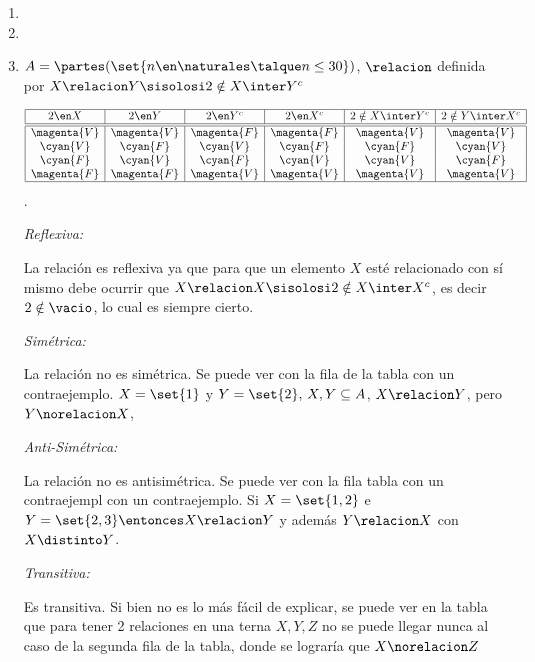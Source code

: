 \begin{enumerate}[label=\roman*)]
  \item \hacer
  \item \hacer
  \item $
          A =
          \partes(\set{n \en \naturales \talque n \leq 30})$, $\relacion$ definida por $X \relacion Y \sisolosi 2 \notin X \inter Y^c
        $\par
        $$
          \begin{array}{|c|c|c|c|c|c|}
            \hline
            2 \en X     & 2 \en Y     & 2 \en Y^c   & 2 \en X^c   & 2 \notin X \inter Y^c & 2 \notin Y \inter X^c \\ \hline  \hline
            \magenta{V} & \magenta{V} & \magenta{F} & \magenta{F} & \magenta{V}           & \magenta{V}           \\
            \cyan{V}    & \cyan{F}    & \cyan{V}    & \cyan{F}    & \cyan{F}              & \cyan{V}              \\
            \cyan{F}    & \cyan{V}    & \cyan{F}    & \cyan{V}    & \cyan{V}              & \cyan{F}              \\
            \magenta{F} & \magenta{F} & \magenta{V} & \magenta{V} & \magenta{V}           & \magenta{V}           \\ \hline
          \end{array}$$.

        \textit{Reflexiva:}\par
        La relación es reflexiva ya que para que un elemento $X$ esté relacionado con sí mismo debe ocurrir
        que $X \relacion X \sisolosi 2 \notin X \inter X^c$, es decir $2 \notin \vacio$, lo cual es siempre cierto.

        \textit{Simétrica:}\par
        La relación no es simétrica. Se puede ver con la  fila de la tabla con un contraejemplo.
        $X = \set{1}$ y $Y = \set{2},\, X,Y \subseteq A$, $X \relacion Y$, pero $Y \norelacion X$,

        \textit{Anti-Simétrica:}\par
        La relación no es antisimétrica. Se puede ver con la  fila tabla con un contraejempl
        con un contraejemplo. Si $X = \set{1,2}$ e $Y = \set{2,3} \entonces X \relacion Y$ y además $Y \relacion X$
        con  $X \distinto Y$.

        \textit{Transitiva:}\par
        Es transitiva. Si bien no es lo más fácil de explicar, se puede ver en la tabla que para tener 2 relaciones
        en una terna $X, Y, Z$ no se puede llegar nunca al caso de la segunda fila de la tabla, donde se lograría que
        $X \norelacion Z$


\end{enumerate}
